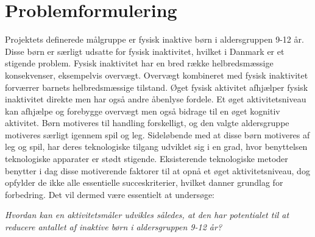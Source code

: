 \newpage \section{Problemformulering}\label{Problemformulering}
Projektets definerede målgruppe er fysisk inaktive børn i aldersgruppen 9-12 år. Disse børn er særligt udsatte for fysisk inaktivitet, hvilket i Danmark er et stigende problem. Fysisk inaktivitet har en bred række helbredsmæssige konsekvenser, eksempelvis overvægt. Overvægt kombineret med fysisk inaktivitet forværrer barnets helbredsmæssige tilstand. Øget fysisk aktivitet afhjælper fysisk inaktivitet direkte men har også andre åbenlyse fordele. Et øget aktivitetsniveau kan afhjælpe og forebygge overvægt men også bidrage til en øget kognitiv aktivitet. Børn motiveres til handling forskelligt, og den valgte aldersgruppe motiveres særligt igennem spil og leg. Sideløbende med at disse børn motiveres af leg og spil, har deres teknologiske tilgang udviklet sig i en grad, hvor benyttelsen teknologiske apparater er stødt stigende. Eksisterende teknologiske metoder benytter i dag disse motiverende faktorer til at opnå et øget aktivitetsniveau, dog opfylder de ikke alle essentielle succeskriterier, hvilket danner grundlag for forbedring. Det vil dermed være essentielt at undersøge:


\begin{center}
\textit{Hvordan kan en aktivitetsmåler udvikles således, at den har potentialet til at reducere antallet af inaktive børn i aldersgruppen 9-12 år?}
\end{center}

%
%	

